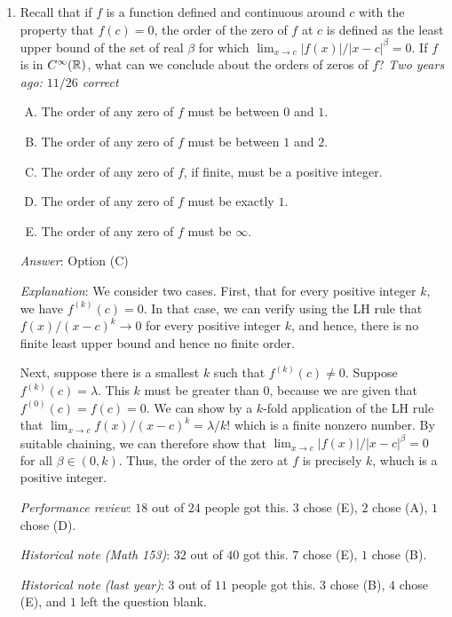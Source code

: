 \documentclass[10pt]{amsart}
\begin{document}
\begin{enumerate}

\item Recall that if $f$ is a function defined and continuous around
  $c$ with the property that $f(c) = 0$, the order of the zero of $f$
  at $c$ is defined as the least upper bound of the set of real $\beta$ for
  which $\lim_{x \to c} |f(x)|/|x - c|^\beta = 0$. If $f$ is in
  $C^{\infty}(\mathbb{R})$, what can we conclude about the orders of zeros of
  $f$? {\em Two years ago: $11/26$ correct}

  \begin{enumerate}[(A)]
  \item The order of any zero of $f$ must be between $0$ and $1$.
  \item The order of any zero of $f$ must be between $1$ and $2$.
  \item The order of any zero of $f$, if finite, must be a positive
  integer.
  \item The order of any zero of $f$ must be exactly $1$.
  \item The order of any zero of $f$ must be $\infty$.
  \end{enumerate}

  {\em Answer}: Option (C)

  {\em Explanation}: We consider two cases. First, that for every
  positive integer $k$, we have $f^{(k)}(c) = 0$. In that case, we can
  verify using the LH rule that $f(x)/(x - c)^k \to 0$ for every
  positive integer $k$, and hence, there is no finite least upper
  bound and hence no finite order.

  Next, suppose there is a smallest $k$ such that $f^{(k)}(c) \ne
  0$. Suppose $f^{(k)}(c) = \lambda$. This $k$ must be greater than
  $0$, because we are given that $f^{(0)}(c) = f(c) = 0$. We can show
  by a $k$-fold application of the LH rule that $\lim_{x \to c}
  f(x)/(x - c)^k = \lambda/k!$ which is a finite nonzero number. By
  suitable chaining, we can therefore show that $\lim_{x \to c}
  |f(x)|/|x - c|^\beta = 0$ for all $\beta \in (0,k)$. Thus, the order
  of the zero at $f$ is precisely $k$, whuch is a positive integer.

  {\em Performance review}: $18$ out of $24$ people got this. $3$
  chose (E), $2$ chose (A), $1$ chose (D).

  {\em Historical note (Math 153)}: $32$ out of $40$ got this. $7$ chose (E),
  $1$ chose (B).

  {\em Historical note (last year)}: $3$ out of $11$ people got this. $3$ chose
  (B), $4$ chose (E), and $1$ left the question blank.


\end{enumerate}
\end{document}
